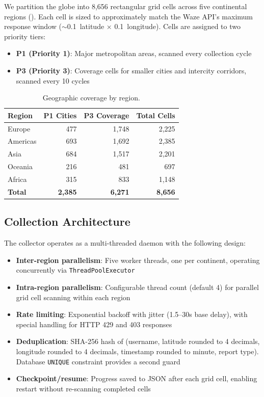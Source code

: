 \documentclass[11pt,a4paper]{article}
\begin{document}
We partition the globe into 8,656 rectangular grid cells across five continental regions (). Each cell is sized to approximately match the Waze API's maximum response window ($\sim$0.1\degree\ latitude $\times$ 0.1\degree\ longitude). Cells are assigned to two priority tiers:

\begin{itemize}
    \item \textbf{P1 (Priority 1)}: Major metropolitan areas, scanned every collection cycle
    \item \textbf{P3 (Priority 3)}: Coverage cells for smaller cities and intercity corridors, scanned every 10 cycles
\end{itemize}

\begin{table}[ht]
\centering
\caption{Geographic coverage by region.}
\label{tab:coverage}
\begin{tabular}{lrrr}
\toprule
\textbf{Region} & \textbf{P1 Cities} & \textbf{P3 Coverage} & \textbf{Total Cells} \\
\midrule
Europe    & 477 & 1,748 & 2,225 \\
Americas  & 693 & 1,692 & 2,385 \\
Asia      & 684 & 1,517 & 2,201 \\
Oceania   & 216 &   481 &   697 \\
Africa    & 315 &   833 & 1,148 \\
\midrule
\textbf{Total} & \textbf{2,385} & \textbf{6,271} & \textbf{8,656} \\
\bottomrule
\end{tabular}
\end{table}

\subsection{Collection Architecture}

The collector operates as a multi-threaded daemon with the following design:

\begin{itemize}
    \item \textbf{Inter-region parallelism}: Five worker threads, one per continent, operating concurrently via \texttt{ThreadPoolExecutor}
    \item \textbf{Intra-region parallelism}: Configurable thread count (default 4) for parallel grid cell scanning within each region
    \item \textbf{Rate limiting}: Exponential backoff with jitter (1.5--30s base delay), with special handling for HTTP 429 and 403 responses
    \item \textbf{Deduplication}: SHA-256 hash of (username, latitude rounded to 4 decimals, longitude rounded to 4 decimals, timestamp rounded to minute, report type). Database \texttt{UNIQUE} constraint provides a second guard
    \item \textbf{Checkpoint/resume}: Progress saved to JSON after each grid cell, enabling restart without re-scanning completed cells
\end{itemize}
\end{document}
